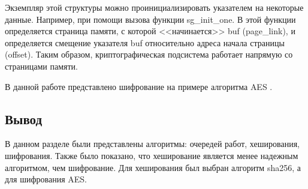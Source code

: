 Экземпляр этой структуры можно проинициализировать указателем на некоторые данные. Например, при помощи вызова функции sg\_init\_one.
В этой функции определяется страница памяти, с которой <<начинается>> buf (page\_link), и определяется смещение указателя buf относительно адреса начала страницы (offset).
Таким образом, криптографическая подсистема работает напрямую со страницами памяти.

В данной работе представлено шифрование на примере алгоритма AES \cite{aes}.

\subsection*{Вывод}

В данном разделе были представлены алгоритмы: очередей работ, хеширования, шифрования.
Также было показано, что хеширование является менее надежным алгоритмом, чем шифрование.
Для хеширования был выбран алгоритм sha256, а для шифрования AES.